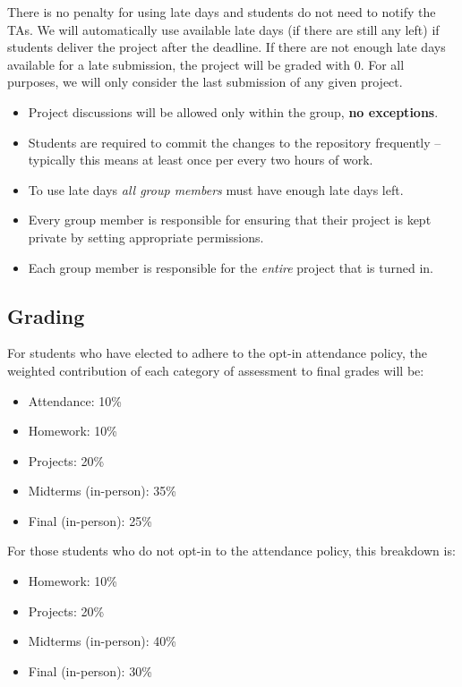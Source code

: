 \documentclass[letterpaper,11pt]{article}
\begin{document}
There is no penalty for using late days and students do not need to
notify the TAs.  We will automatically use available late days (if
there are still any left) if students deliver the project after the
deadline. If there are not enough late days available for a late
submission, the project will be graded with 0. For all purposes, we
will only consider the last submission of any given project.

\begin{itemize}
\item Project discussions will be allowed only within the group,
  \textbf{no exceptions}.
\item Students are required to commit the changes to the repository
  frequently -- typically this means at least once per every two hours
  of work.
\item To use late days \textit{all group members} must have enough
  late days left.
\item Every group member is responsible for ensuring that their
  project is kept private by setting appropriate permissions.
\item Each group member is responsible for the \emph{entire} project
  that is turned in.
\end{itemize}

\subsection*{Grading}
For students who have elected to adhere to the opt-in attendance
policy, the weighted contribution of each category of assessment to
final grades will be:

\begin{itemize}
\item Attendance: 10\%
\item Homework: 10\%
\item Projects: 20\%
\item Midterms (in-person): 35\%
\item Final (in-person): 25\%
\end{itemize}

For those students who do not opt-in to the attendance policy, this
breakdown is:

\begin{itemize}
\item Homework: 10\%
\item Projects: 20\%
\item Midterms (in-person): 40\%
\item Final (in-person): 30\%
\end{itemize}
\end{document}
